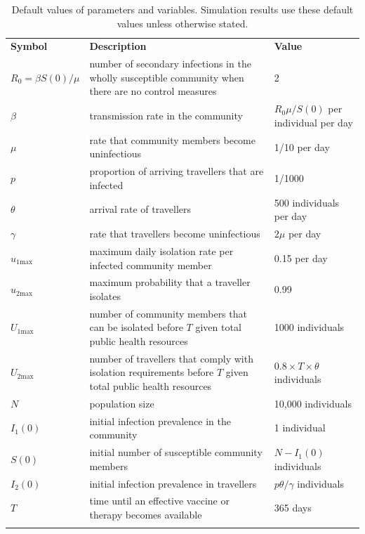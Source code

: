 \documentclass[pdflatex]{sn-jnl}
\theoremstyle{thmstyleone}%
\theoremstyle{thmstyletwo}%
\theoremstyle{thmstylethree}%
\begin{document}
\begin{table}[h]
        \centering 
        \caption{Default values of parameters and variables. Simulation results use these default values unless otherwise stated.}
        \begin{tabular}{p{2cm}p{5cm}p{5cm}}
        \toprule
            \textbf{Symbol} & \textbf{Description} & \textbf{Value} \\
        \botrule
        $R_0 = \beta S(0)/\mu$ & number of secondary infections in the wholly susceptible community when there are no control measures & 2 \\
            $\beta$ & transmission rate in the community & $R_0\mu/S(0)$ per individual per day \\
            $\mu$ & rate that community members become uninfectious & 1/10 per day \\
            $p$ & proportion of arriving travellers that are infected & 1/1000 \\
            $\theta$ & arrival rate of travellers & 500 individuals per day \\
            $\gamma$ & rate that travellers become uninfectious & $2\mu$ per day \\
            \midrule
            $u_{1\text{max}}$ & maximum daily isolation rate per infected community member & 0.15 per day \\
            $u_{2\text{max}}$ & maximum probability that a traveller isolates & 0.99\\
            $U_{1\text{max}}$ & number of community members that can be isolated before $T$ given total public health resources & 1000 individuals \\
            $U_{2\text{max}}$ & number of travellers that comply with isolation requirements before $T$ given total public health resources & $0.8 \times T \times \theta$ individuals \\
            \midrule
            $N$ & population size & 10,000 individuals\\
            $I_1(0)$ & initial infection prevalence in the community & 1 individual\\
            $S(0)$ & initial number of susceptible community members & $N - I_1(0)$ individuals\\
            $I_2(0)$ & initial infection prevalence in travellers & $p\theta/\gamma$ individuals \\
            $T$ & time until an effective vaccine or therapy becomes available & 365 days \\
            \botrule
        \end{tabular}
        \label{tab:params}
    \end{table}
\end{document}
